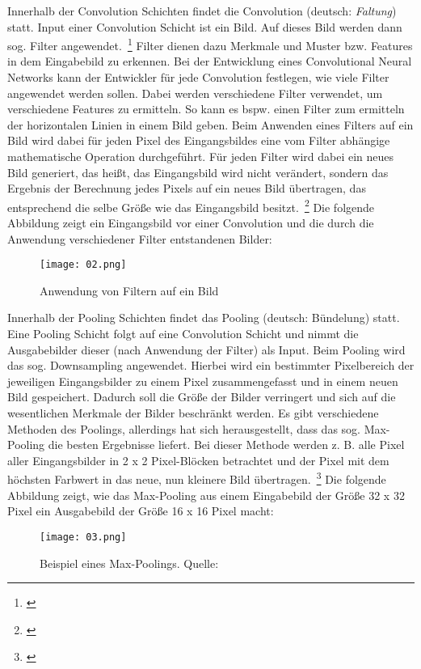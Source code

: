 Innerhalb der Convolution Schichten findet die Convolution (deutsch: \textit{Faltung}) statt. Input einer Convolution Schicht ist ein Bild. Auf dieses Bild werden dann sog. Filter angewendet.~\footnote{\cite{TensorFlow.2018b}} Filter dienen dazu Merkmale und Muster bzw. Features in dem Eingabebild zu erkennen. Bei der Entwicklung eines Convolutional Neural Networks kann der Entwickler für jede Convolution festlegen, wie viele Filter angewendet werden sollen. Dabei werden verschiedene Filter verwendet, um verschiedene Features zu ermitteln. So kann es bspw. einen Filter zum ermitteln der horizontalen Linien in einem Bild geben. Beim Anwenden eines Filters auf ein Bild wird dabei für jeden Pixel des Eingangsbildes eine vom Filter abhängige mathematische Operation durchgeführt. Für jeden Filter wird dabei ein neues Bild generiert, das heißt, das Eingangsbild wird nicht verändert, sondern das Ergebnis der Berechnung jedes Pixels auf ein neues Bild übertragen, das entsprechend die selbe Größe wie das Eingangsbild besitzt.~\footnote{\cite[S.~90--91]{HabibiAghdam.2017}} Die folgende Abbildung zeigt ein Eingangsbild vor einer Convolution und die durch die Anwendung verschiedener Filter entstandenen Bilder:

\begin{figure}[!h]
	\texttt{[image: 02.png]}
	\caption{Anwendung von Filtern auf ein Bild}
	\label{fig:02}
\end{figure}

Innerhalb der Pooling Schichten findet das Pooling (deutsch: Bündelung) statt. Eine Pooling Schicht folgt auf eine Convolution Schicht und nimmt die Ausgabebilder dieser (nach Anwendung der Filter) als Input. Beim Pooling wird das sog. Downsampling angewendet. Hierbei wird ein bestimmter Pixelbereich der jeweiligen Eingangsbilder zu einem Pixel zusammengefasst und in einem neuen Bild gespeichert. Dadurch soll die Größe der Bilder verringert und sich auf die wesentlichen Merkmale der Bilder beschränkt werden. Es gibt verschiedene Methoden des Poolings, allerdings hat sich herausgestellt, dass das sog. Max-Pooling die besten Ergebnisse liefert. Bei dieser Methode werden z. B. alle Pixel aller Eingangsbilder in 2 x 2 Pixel-Blöcken betrachtet und der Pixel mit dem höchsten Farbwert in das neue, nun kleinere Bild übertragen.~\footnote{\cite{HabibiAghdam.2017}} Die folgende Abbildung zeigt, wie das Max-Pooling aus einem Eingabebild der Größe 32 x 32 Pixel ein Ausgabebild der Größe 16 x 16 Pixel macht:

\begin{figure}[!h]
	\texttt{[image: 03.png]}
	\caption{Beispiel eines Max-Poolings. Quelle: \cite[S.~96]{HabibiAghdam.2017}}
	\label{fig:03}
\end{figure}

